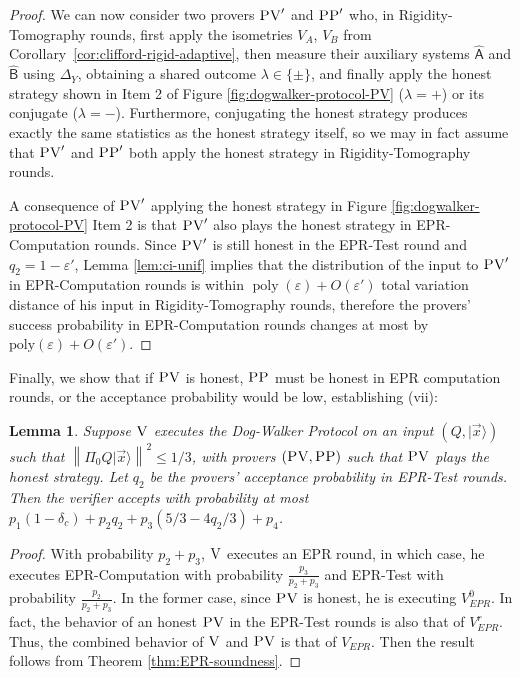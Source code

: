 \documentclass[11pt]{article}
\newtheorem{lemma}[theorem]{Lemma}
\theoremstyle{remark}
\theoremstyle{definition}
\newcommand{\ket}[1]{|#1\rangle}
\DeclareMathOperator{\poly}{poly}
\newcommand{\reg}[1]{{\textsf{#1}}}
\newcommand{\norm}[1]{\left\|#1\right\|}
\newcommand{\eps}{\varepsilon}
\newcommand{\ver}{\textsc{V}}
\newcommand{\pv}{\textsc{PV}}
\newcommand{\pp}{\textsc{PP}}
\begin{document}
\begin{proof}
We can now consider two provers $\pv'$ and $\pp'$ who, in Rigidity-Tomography rounds, first apply the isometries $V_A$, $V_B$ from Corollary~\ref{cor:clifford-rigid-adaptive}, then  measure their auxiliary systems $\hat{\reg{A}}$ and $\hat{\reg{B}}$ using $\Delta_Y$, obtaining a shared outcome $\lambda\in\{\pm\}$, and finally apply the honest strategy shown in Item 2 of Figure \ref{fig:dogwalker-protocol-PV} ($\lambda=+$) or its conjugate ($\lambda = -$). Furthermore, conjugating the honest strategy produces exactly the same statistics as the honest strategy itself, so we may in fact assume that $\pv'$ and $\pp'$ both apply the honest strategy in Rigidity-Tomography rounds. 


A consequence of $\pv'$ applying the honest strategy in Figure \ref{fig:dogwalker-protocol-PV} Item 2 is that $\pv'$ also plays the honest strategy in EPR-Computation rounds. Since $\pv'$ is still honest in the EPR-Test round and $q_2 = 1-\eps'$, Lemma \ref{lem:ci-unif} implies that the distribution of the input to $\pv'$ in EPR-Computation rounds is within $\poly(\eps)+O(\eps')$ total variation distance of his input in
Rigidity-Tomography rounds, therefore the provers' success probability in EPR-Computation rounds changes at most by $\mathrm{poly}(\eps)+O(\eps')$. 
\end{proof}


Finally, we show that if $\pv$ is honest, $\pp$ must be honest in EPR computation rounds, or the acceptance probability would be low, establishing (vii):
\begin{lemma}\label{lem:PP-3}
Suppose $\ver$ %
 executes the Dog-Walker Protocol on an input $(Q,\ket{\vec{x}})$ such that $\norm{\Pi_0 Q\ket{\vec{x}}}^2\leq 1/3$, with provers $(\pv,\pp)$ such that $\pv$ plays the honest strategy. Let $q_2$ be the provers' acceptance probability in EPR-Test rounds. Then the verifier accepts with probability at most
  $p_1(1-\delta_c) +p_2q_2+p_3(5/3-4q_2/3)+p_4$. 
\end{lemma}
\begin{proof}
With probability $p_2+p_3$, $\ver$ executes an EPR round, in which case, he executes EPR-Computation with probability $\frac{p_3}{p_2+p_3}$ and EPR-Test with probability $\frac{p_2}{p_2+p_3}$. In the former case, since $\pv$ is honest, he is executing $V_{EPR}^0$. In fact, the behavior of an honest $\pv$ in the EPR-Test rounds is also that of $V_{EPR}^r$. Thus, the combined behavior of $\ver$ and $\pv$ is that of $V_{EPR}$. Then the result follows from Theorem \ref{thm:EPR-soundness}. 
\end{proof}
\end{document}
